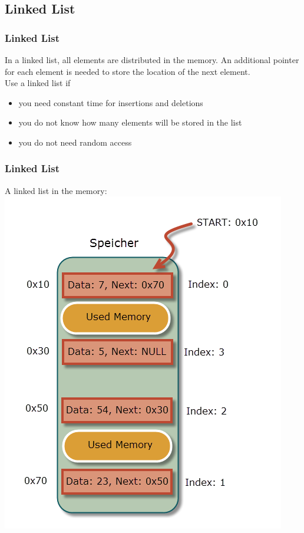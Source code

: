\subsection{Linked List}
\begin{frame}[fragile]
\frametitle{Linked List}
In a linked list, all elements are distributed in the memory. An additional pointer
for each element is needed to store the location of the next element.\\
Use a linked list if
\begin{itemize}
\item you need constant time for insertions and deletions
\item you do not know how many elements will be stored in the list
\item you do not need random access
\end{itemize}
\end{frame}

\begin{frame}[fragile]
\frametitle{Linked List}
A linked list in the memory:\\
\vspace{1mm}
\includegraphics[scale=0.35]{img/linkedlist.png}
\end{frame}

